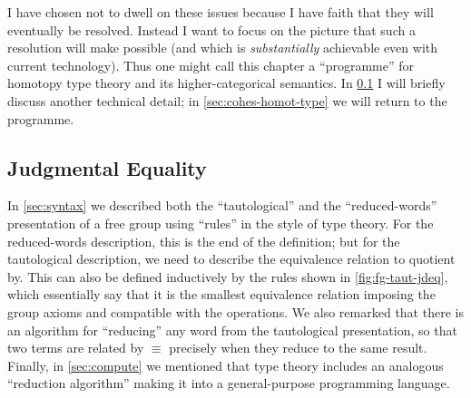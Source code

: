 \documentclass[12pt]{article}
\let\jdeq\equiv
\def\oo{\ensuremath{\infty}}
\def\io{\ensuremath{(\oo,1)}}
\def\equiv{\mathsf{Equiv}}
\numberwithin{equation}{section}
\begin{document}
\begin{subappendices}
I have chosen not to dwell on these issues because I have faith that they will eventually be resolved.
Instead I want to focus on the picture that such a resolution will make possible (and which is \emph{substantially} achievable even with current technology).
Thus one might call this chapter a ``programme'' for homotopy type theory and its higher-categorical semantics.
In \cref{sec:equality} I will briefly discuss another technical detail; in \cref{sec:cohes-homot-type} we will return to the programme.

\subsection{Judgmental Equality}
\label{sec:equality}

In \cref{sec:syntax} we described both the ``tautological'' and the ``reduced-words'' presentation of a free group using ``rules'' in the style of type theory. %
For the reduced-words description, this is the end of the definition; but for the tautological description, we need to describe the equivalence relation to quotient by.
This can also be defined inductively by the rules shown in \cref{fig:fg-taut-jdeq}, which essentially say that it is the smallest equivalence relation imposing the group axioms and compatible with the operations.
We also remarked that there is an algorithm for ``reducing'' any word from the tautological presentation, so that two terms are related by $\jdeq$ precisely when they reduce to the same result.
Finally, in \cref{sec:compute} we mentioned that type theory includes an analogous ``reduction algorithm'' making it into a general-purpose programming language.


\end{subappendices}
\end{document}
